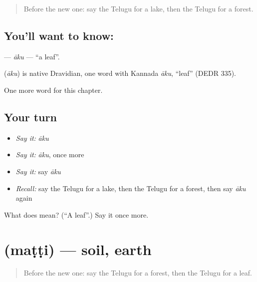 \label{lesson:TE-C120-aku}



\begin{quote}
Before the new one: say the Telugu for a lake, then the Telugu for a forest.
\end{quote}

\subsection*{You'll want to know: }
\textbf{} — \emph{āku} — \textquotedblleft{}a leaf\textquotedblright{}.

\begin{cousinweb}
\textbf{} (\emph{āku}) is native Dravidian, one word with Kannada \emph{āku}, \textquotedblleft{}leaf\textquotedblright{} (DEDR 335).
\end{cousinweb}

\begin{grammarlens}[title={What you've built}]
One more word for this chapter.
\end{grammarlens}

\subsection*{Your turn}
\begin{itemize}
\raggedright
  \item \emph{Say it:} \emph{āku}
  \item \emph{Say it:} \emph{āku}, once more
  \item \emph{Say it:} say \emph{āku}
  \item \emph{Recall:} say the Telugu for a lake, then the Telugu for a forest, then say \emph{āku} again
\end{itemize}

\begin{tcolorbox}[breakable,colback=teal!4,colframe=teal!35!black,title={Before you move on}]
What does  mean? (\textquotedblleft{}A leaf\textquotedblright{}.) Say it once more.
\end{tcolorbox}
\section[\texorpdfstring{\te{మట్టి} (maṭṭi)}{మట్టి (maṭṭi)}]{ (maṭṭi) — soil, earth}

\label{lesson:TE-C120-matti}



\begin{quote}
Before the new one: say the Telugu for a forest, then the Telugu for a leaf.
\end{quote}

